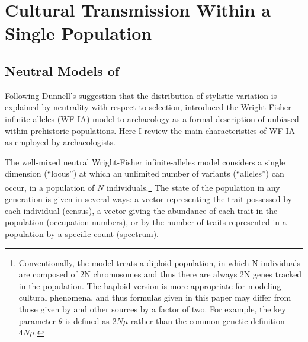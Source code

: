 \section{Cultural Transmission Within a Single Population}
\label{sec:ct-models-within-population}

\subsection{Neutral Models of \CT}
\label{sec:neutral-models-single-population}

Following Dunnell's \citeyearpar{8961} suggestion that the distribution of stylistic variation is explained by neutrality with respect to selection,
\citet{Neiman1995} introduced the Wright-Fisher infinite-alleles (WF-IA) model to archaeology as a formal description of unbiased \ct within prehistoric populations.  Here I review the main characteristics of WF-IA as employed by archaeologists.   

The well-mixed neutral Wright-Fisher infinite-alleles model \citep{kimura1964number} considers a single dimension (``locus'') at which an unlimited number of variants (``alleles'') can occur, in a population of $N$ individuals.\footnote{Conventionally, the model treats a diploid population, in which N individuals are composed of 2N chromosomes and thus there are always 2N genes tracked in the population.  The haploid version is more appropriate for modeling cultural phenomena, and thus formulas given in this paper may differ from those given by \citet{Ewens2004} and other sources by a factor of two.  For example, the key parameter $\theta$ is defined as $2N\mu$ rather than the common genetic definition $4N\mu$.}  The state of the population in any generation is given in several ways:  a vector representing the trait possessed by each individual (census), a vector giving the abundance of each trait in the population (occupation numbers), or by the number of traits represented in a population by a specific count (spectrum).  

